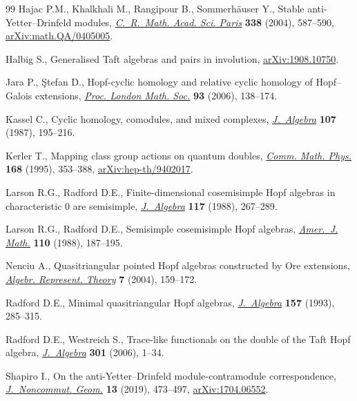 \documentclass[pdftex]{sigma}
\numberwithin{equation}{section}
\begin{document}
\begin{thebibliography}{99}
Hajac P.M., Khalkhali M., Rangipour B., Sommerh\"auser Y., Stable
 anti-{Y}etter--{D}rinfeld modules, \href{https://doi.org/10.1016/j.crma.2003.11.037}{\textit{C.~R.~Math. Acad. Sci. Paris}}
 \textbf{338} (2004), 587--590, \href{https://arxiv.org/abs/math.QA/0405005}{arXiv:math.QA/0405005}.

Halbig S., Generalised {T}aft algebras and pairs in involution,
 \href{https://arxiv.org/abs/1908.10750}{arXiv:1908.10750}.

Jara P., \c{S}tefan D., Hopf-cyclic homology and relative cyclic homology of
 {H}opf--{G}alois extensions, \href{https://doi.org/10.1017/S0024611506015772}{\textit{Proc. London Math. Soc.}} \textbf{93}
 (2006), 138--174.

Kassel C., Cyclic homology, comodules, and mixed complexes, \href{https://doi.org/10.1016/0021-8693(87)90086-X}{\textit{J.~Algebra}}
 \textbf{107} (1987), 195--216.

Kerler T., Mapping class group actions on quantum doubles, \href{https://doi.org/10.1007/BF02101554}{\textit{Comm. Math.
 Phys.}} \textbf{168} (1995), 353--388, \href{https://arxiv.org/abs/hep-th/9402017}{arXiv:hep-th/9402017}.

Larson R.G., Radford D.E., Finite-dimensional cosemisimple {H}opf algebras in
 characteristic {$0$} are semisimple, \href{https://doi.org/10.1016/0021-8693(88)90107-X}{\textit{J.~Algebra}} \textbf{117} (1988),
 267--289.

Larson R.G., Radford D.E., Semisimple cosemisimple {H}opf algebras,
 \href{https://doi.org/10.2307/2374545}{\textit{Amer.~J. Math.}} \textbf{110} (1988), 187--195.

Nenciu A., Quasitriangular pointed {H}opf algebras constructed by {O}re
 extensions, \href{https://doi.org/10.1023/B:ALGE.0000026785.03997.60}{\textit{Algebr. Represent. Theory}} \textbf{7} (2004), 159--172.

Radford D.E., Minimal quasitriangular {H}opf algebras, \href{https://doi.org/10.1006/jabr.1993.1102}{\textit{J.~Algebra}}
 \textbf{157} (1993), 285--315.

Radford D.E., Westreich S., Trace-like functionals on the double of the {T}aft
 {H}opf algebra, \href{https://doi.org/10.1016/j.jalgebra.2004.04.023}{\textit{J.~Algebra}} \textbf{301} (2006), 1--34.

Shapiro I., On the anti-{Y}etter--{D}rinfeld module-contramodule
 correspondence, \href{https://doi.org/10.4171/JNCG/327}{\textit{J.~Noncommut. Geom.}} \textbf{13} (2019), 473--497,
 \href{https://arxiv.org/abs/1704.06552}{arXiv:1704.06552}.


\end{thebibliography}
\end{document}
